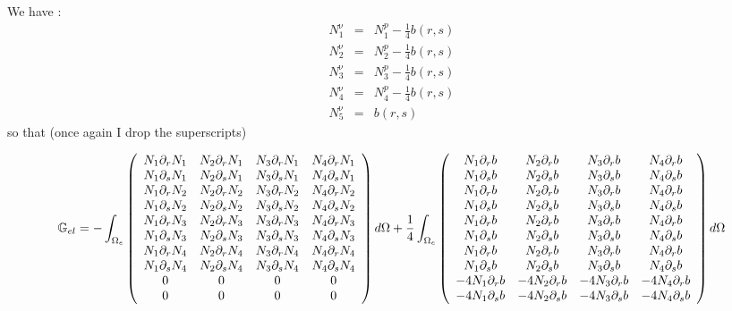We have :
\begin{eqnarray} 
N_1^\upnu &=& N_1^p - \frac{1}{4}b(r,s)  \\
N_2^\upnu &=& N_2^p - \frac{1}{4}b(r,s)  \\
N_3^\upnu &=& N_3^p - \frac{1}{4}b(r,s)  \\
N_4^\upnu &=& N_4^p - \frac{1}{4}b(r,s)  \\
N_5^\upnu &=& b(r,s)  
\end{eqnarray}
so that (once again I drop the superscripts)
\begin{small}
\begin{eqnarray}
{\mathbb{G}}_{el} =
-\int_{\Omega_e}
\left(
\begin{array}{cccc}
N_1\partial_r N_1 & N_2\partial_r N_1 & N_3\partial_r N_1 & N_4\partial_r N_1 \\
N_1\partial_s N_1 & N_2\partial_s N_1 & N_3\partial_s N_1 & N_4\partial_s N_1 \\
N_1\partial_r N_2 & N_2\partial_r N_2 & N_3\partial_r N_2 & N_4\partial_r N_2 \\
N_1\partial_s N_2 & N_2\partial_s N_2 & N_3\partial_s N_2 & N_4\partial_s N_2 \\
N_1\partial_r N_3 & N_2\partial_r N_3 & N_3\partial_r N_3 & N_4\partial_r N_3 \\
N_1\partial_s N_3 & N_2\partial_s N_3 & N_3\partial_s N_3 & N_4\partial_s N_3 \\
N_1\partial_r N_4 & N_2\partial_r N_4 & N_3\partial_r N_4 & N_4\partial_r N_4 \\
N_1\partial_s N_4 & N_2\partial_s N_4 & N_3\partial_s N_4 & N_4\partial_s N_4 \\
0 & 0 & 0 & 0 \\
0 & 0 & 0 & 0 
\end{array}
\right)
d\Omega 
+
\frac{1}{4}\int_{\Omega_e}
\left(
\begin{array}{cccc}
N_1\partial_r b & N_2\partial_r b & N_3\partial_r b & N_4\partial_r b \\
N_1\partial_s b & N_2\partial_s b & N_3\partial_s b & N_4\partial_s b\\
N_1\partial_r b & N_2\partial_r b & N_3\partial_r b & N_4\partial_r b\\
N_1\partial_s b & N_2\partial_s b & N_3\partial_s b & N_4\partial_s b\\
N_1\partial_r b & N_2\partial_r b & N_3\partial_r b & N_4\partial_r b\\
N_1\partial_s b & N_2\partial_s b & N_3\partial_s b & N_4\partial_s b\\
N_1\partial_r b & N_2\partial_r b & N_3\partial_r b & N_4\partial_r b\\
N_1\partial_s b & N_2\partial_s b & N_3\partial_s b & N_4\partial_s b\\
-4N_1\partial_r b & -4N_2\partial_r b & -4N_3\partial_r b & -4N_4\partial_r b \\
-4N_1\partial_s b & -4N_2\partial_s b & -4N_3\partial_s b & -4N_4\partial_s b
\end{array}
\right)
d\Omega \nonumber
\end{eqnarray}
\end{small}

